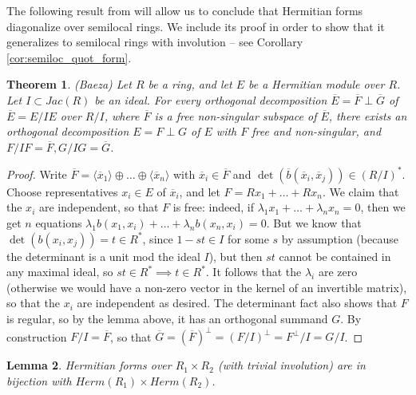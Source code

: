 \documentclass[edeposit,fullpage]{uiucthesis2009}
\theoremstyle{plain}
\newtheorem{lemma}{Lemma}
\numberwithin{lemma}{section}
\newtheorem{theorem}[lemma]{Theorem}
\theoremstyle{definition}
\begin{document}
The following result from \cite{Baeza} will allow us to conclude that
Hermitian forms diagonalize over semilocal rings. We include its proof
in order to show that it generalizes to semilocal rings with
involution -- see Corollary \ref{cor:semiloc_quot_form}.

\begin{theorem}(Baeza)
Let $R$ be a ring, and let $E$ be a Hermitian module over
$R$. Let $I \subset Jac(R)$ be an ideal. For every orthogonal decomposition $\overline E = \overline F
\perp \overline G$ of $\overline E = E/IE$ over $R/I$, where $\overline
F$ is a free non-singular subspace of $\overline E$, there exists an
orthogonal decomposition $E = F \perp G$ of $E$ with $F$ free and
non-singular, and $F/IF = \overline F, G/IG = \overline G$.
\end{theorem}

\begin{proof}
Write $\overline F = \langle \overline x_1 \rangle \oplus \dots \oplus
\langle \overline x_n \rangle$ with $\overline x_i \in \overline F$
and $\det(\overline b(\overline x_i,\overline x_j)) \in (R/I)^*$. Choose
representatives $x_i \in E$ of $\overline x_i$, and let $F = Rx_1 +
\dots + Rx_n$. We claim that the $x_i$ are independent, so that $F$ is
free: indeed, if $\lambda_1x_1 + \dots + \lambda_nx_n = 0$, then we
get $n$ equations $\lambda_1b(x_1,x_i) + \dots + \lambda_nb(x_n,x_i) =
0$. But we know that $\det(b(x_i,x_j)) = t\in R^*$, since $1-st \in I$
for some $s$ by assumption (because the determinant is a unit mod the
ideal $I$), but then $st$ cannot be contained in any
maximal ideal, so $st \in R^*
\implies t \in R^*$. It follows that the $\lambda_i$ are zero
(otherwise we would have a non-zero vector in the kernel of an
invertible matrix), so that
the $x_i$ are independent as desired. The determinant fact also shows
that $F$ is regular, so by the lemma above, it has an orthogonal
summand $G$. By construction $F/I = \overline F$, so that $\overline G
= (\overline
F)^{\perp} = (F/I)^{\perp} = F^{\perp}/I = G/I$.
\end{proof}

\begin{lemma}
Hermitian forms over $R_1 \times R_2$ (with trivial involution) are in bijection with $Herm(R_1)
\times Herm(R_2)$.
\end{lemma}
\end{document}
